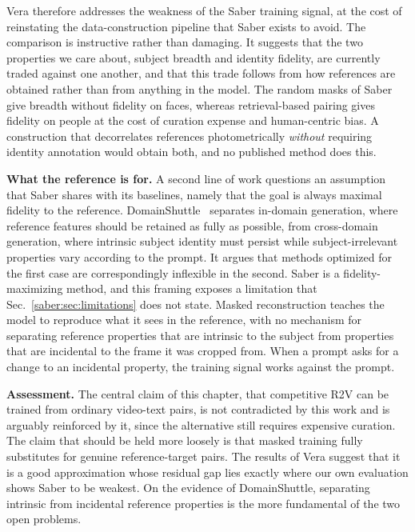 Vera therefore addresses the weakness of the Saber training signal, at the cost of reinstating the data-construction pipeline that Saber exists to avoid. The comparison is instructive rather than damaging. It suggests that the two properties we care about, subject breadth and identity fidelity, are currently traded against one another, and that this trade follows from how references are obtained rather than from anything in the model. The random masks of Saber give breadth without fidelity on faces, whereas retrieval-based pairing gives fidelity on people at the cost of curation expense and human-centric bias. A construction that decorrelates references photometrically \emph{without} requiring identity annotation would obtain both, and no published method does this.

\noindent \textbf{What the reference is for.}
A second line of work questions an assumption that Saber shares with its baselines, namely that the goal is always maximal fidelity to the reference. DomainShuttle~\citep{chen2026domainshuttle} separates in-domain generation, where reference features should be retained as fully as possible, from cross-domain generation, where intrinsic subject identity must persist while subject-irrelevant properties vary according to the prompt. It argues that methods optimized for the first case are correspondingly inflexible in the second. Saber is a fidelity-maximizing method, and this framing exposes a limitation that Sec.~\ref{saber:sec:limitations} does not state. Masked reconstruction teaches the model to reproduce what it sees in the reference, with no mechanism for separating reference properties that are intrinsic to the subject from properties that are incidental to the frame it was cropped from. When a prompt asks for a change to an incidental property, the training signal works against the prompt.

\noindent \textbf{Assessment.}
The central claim of this chapter, that competitive R2V can be trained from ordinary video-text pairs, is not contradicted by this work and is arguably reinforced by it, since the alternative still requires expensive curation. The claim that should be held more loosely is that masked training fully substitutes for genuine reference-target pairs. The results of Vera suggest that it is a good approximation whose residual gap lies exactly where our own evaluation shows Saber to be weakest. On the evidence of DomainShuttle, separating intrinsic from incidental reference properties is the more fundamental of the two open problems.

